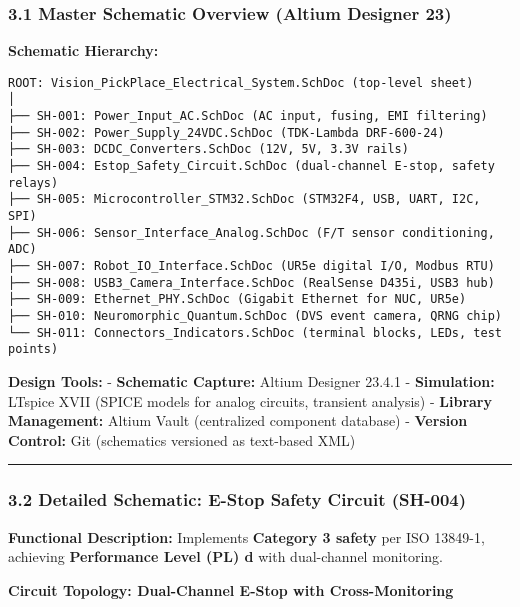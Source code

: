 \documentclass[
]{article}
\begin{document}
\hypertarget{master-schematic-overview-altium-designer-23}{%
\subsubsection{3.1 Master Schematic Overview (Altium Designer
23)}\label{master-schematic-overview-altium-designer-23}}

\textbf{Schematic Hierarchy:}

\begin{verbatim}
ROOT: Vision_PickPlace_Electrical_System.SchDoc (top-level sheet)
│
├── SH-001: Power_Input_AC.SchDoc (AC input, fusing, EMI filtering)
├── SH-002: Power_Supply_24VDC.SchDoc (TDK-Lambda DRF-600-24)
├── SH-003: DCDC_Converters.SchDoc (12V, 5V, 3.3V rails)
├── SH-004: Estop_Safety_Circuit.SchDoc (dual-channel E-stop, safety relays)
├── SH-005: Microcontroller_STM32.SchDoc (STM32F4, USB, UART, I2C, SPI)
├── SH-006: Sensor_Interface_Analog.SchDoc (F/T sensor conditioning, ADC)
├── SH-007: Robot_IO_Interface.SchDoc (UR5e digital I/O, Modbus RTU)
├── SH-008: USB3_Camera_Interface.SchDoc (RealSense D435i, USB3 hub)
├── SH-009: Ethernet_PHY.SchDoc (Gigabit Ethernet for NUC, UR5e)
├── SH-010: Neuromorphic_Quantum.SchDoc (DVS event camera, QRNG chip)
└── SH-011: Connectors_Indicators.SchDoc (terminal blocks, LEDs, test points)
\end{verbatim}

\textbf{Design Tools:} - \textbf{Schematic Capture:} Altium Designer
23.4.1 - \textbf{Simulation:} LTspice XVII (SPICE models for analog
circuits, transient analysis) - \textbf{Library Management:} Altium
Vault (centralized component database) - \textbf{Version Control:} Git
(schematics versioned as text-based XML)

\begin{center}\rule{0.5\linewidth}{0.5pt}\end{center}

\hypertarget{detailed-schematic-e-stop-safety-circuit-sh-004}{%
\subsubsection{3.2 Detailed Schematic: E-Stop Safety Circuit
(SH-004)}\label{detailed-schematic-e-stop-safety-circuit-sh-004}}

\textbf{Functional Description:} Implements \textbf{Category 3 safety}
per ISO 13849-1, achieving \textbf{Performance Level (PL) d} with
dual-channel monitoring.

\textbf{Circuit Topology: Dual-Channel E-Stop with Cross-Monitoring}
\end{document}
